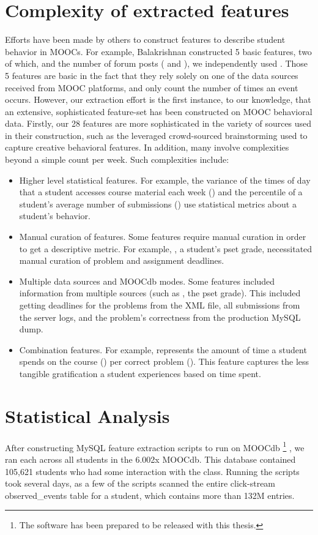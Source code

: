 \section{Complexity of extracted features}
Efforts have been made by others to construct features to describe student behavior in MOOCs. For example, Balakrishnan constructed 5 basic features, two of which, \sti and the number of forum posts ( and ), we independently used \cite{balakrishnan2013predicting}. Those 5 features are basic in the fact that they rely solely on one of the data sources received from MOOC platforms, and only count the number of times an event occurs. However, our extraction effort is the first instance, to our knowledge, that an extensive, sophisticated feature-set has been constructed on MOOC behavioral data. Firstly, our 28 features are more sophisticated in the variety of sources used in their construction, such as the leveraged crowd-sourced brainstorming used to capture creative behavioral features. In addition, many involve complexities beyond a simple count per week. Such complexities include:
\begin{itemize}
\item Higher level statistical features. For example, the variance of the times of day that a student accesses course material each week () and the percentile of a student’s average number of submissions () use statistical metrics about a student’s behavior.
\item Manual curation of features. Some features require manual curation in order to get a descriptive metric. For example, , a student’s pset grade, necessitated manual curation of problem and assignment deadlines.
\item Multiple data sources and MOOCdb modes. Some features included information from multiple sources (such as , the pset grade). This included getting deadlines for the problems from the XML file, all submissions from the server logs, and the problem’s correctness from the production MySQL dump.
\item Combination features. For example,  represents the amount of time a student spends on the course () per correct problem (). This feature captures the less tangible gratification a student experiences based on time spent.
\end{itemize}

\section{Statistical Analysis}
After constructing MySQL feature extraction scripts to run on MOOCdb \footnote{The software has been prepared to be released with this thesis.}
, we ran each across all students in the 6.002x MOOCdb. This database contained 105,621 students who had some interaction with the class. Running the scripts took several days, as a few of the scripts scanned the entire click-stream observed\_events table for a student, which contains more than 132M entries. 

